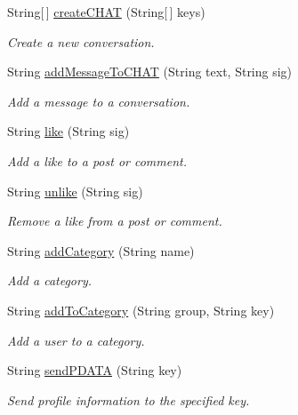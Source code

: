 \begin{DoxyCompactItemize}
String\mbox{[}$\,$\mbox{]} \hyperlink{classballmerpeak_1_1turtlenet_1_1server_1_1TurtlenetImpl_a9dc47df7e7847ac053c189f38b9c7b14}{create\-C\-H\-A\-T} (String\mbox{[}$\,$\mbox{]} keys)
\begin{DoxyCompactList}\small\item\em Create a new conversation. \end{DoxyCompactList}\item 
String \hyperlink{classballmerpeak_1_1turtlenet_1_1server_1_1TurtlenetImpl_a89238dc6ef01ca846a4b616a1d510f85}{add\-Message\-To\-C\-H\-A\-T} (String text, String sig)
\begin{DoxyCompactList}\small\item\em Add a message to a conversation. \end{DoxyCompactList}\item 
String \hyperlink{classballmerpeak_1_1turtlenet_1_1server_1_1TurtlenetImpl_ab806c36948df3c570656cd02025f5188}{like} (String sig)
\begin{DoxyCompactList}\small\item\em Add a like to a post or comment. \end{DoxyCompactList}\item 
String \hyperlink{classballmerpeak_1_1turtlenet_1_1server_1_1TurtlenetImpl_a34dd5b2e3422a38ddd9ab2ded072e870}{unlike} (String sig)
\begin{DoxyCompactList}\small\item\em Remove a like from a post or comment. \end{DoxyCompactList}\item 
String \hyperlink{classballmerpeak_1_1turtlenet_1_1server_1_1TurtlenetImpl_abb2702210515c425be14f39584f761db}{add\-Category} (String name)
\begin{DoxyCompactList}\small\item\em Add a category. \end{DoxyCompactList}\item 
String \hyperlink{classballmerpeak_1_1turtlenet_1_1server_1_1TurtlenetImpl_af382d8d355b9a479d9c047fd9ae722ac}{add\-To\-Category} (String group, String key)
\begin{DoxyCompactList}\small\item\em Add a user to a category. \end{DoxyCompactList}\item 
String \hyperlink{classballmerpeak_1_1turtlenet_1_1server_1_1TurtlenetImpl_a2436ebfe8ae7ed08b831f21f83aaf3bc}{send\-P\-D\-A\-T\-A} (String key)
\begin{DoxyCompactList}\small\item\em Send profile information to the specified key. \end{DoxyCompactList}\item 

\end{DoxyCompactItemize}
